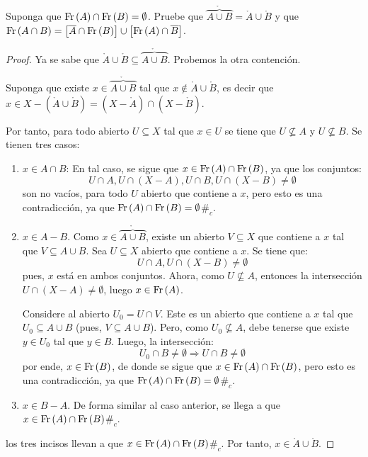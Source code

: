 \documentclass[12pt]{report}
\theoremstyle{largebreak}
\newcommand\contradiction{\ensuremath{\#_c}}
\newcommand{\Int}[1]{\ensuremath{\mathring{#1}}}
\newcommand{\Cls}[1]{\ensuremath{\overline{#1}}}
\newcommand{\Fr}[1]{\ensuremath{\textup{Fr}\left(#1\right)}}
\begin{document}
    \begin{excer}
        Suponga que $\Fr{A}\cap\Fr{B}=\emptyset$. Pruebe que $\Int{\overbrace{A\cup B}}=\Int{A}\cup\Int{B}$ y que $\Fr{A\cap B}=\left[\Cls{A}\cap\Fr{B} \right]\cup\left[\Fr{A}\cap\Cls{B} \right]$.
    \end{excer}

    \begin{proof}
        Ya se sabe que $\Int{A}\cup\Int{B}\subseteq\Int{\overbrace{A\cup B}}$. Probemos la otra contención.

        Suponga que existe $x\in\Int{\overbrace{A\cup B}}$ tal que $x\notin\Int{A}\cup\Int{B}$, es decir que $x\in X-(\Int{A}\cup\Int{B})=(X-\Int{A})\cap(X-\Int{B})$.

        Por tanto, para todo abierto $U\subseteq X$ tal que $x\in U$ se tiene que $U\nsubseteq A$ y $U\nsubseteq B$. Se tienen tres casos:
        \begin{enumerate}
            \item $x\in A\cap B$: En tal caso, se sigue que $x\in\Fr{A}\cap\Fr{B}$, ya que los conjuntos:
            \begin{equation*}
                U\cap A,U\cap (X-A),U\cap B,U\cap(X-B)\neq\emptyset
            \end{equation*}
            son no vacíos, para todo $U$ abierto que contiene a $x$, pero esto es una contradicción, ya que $\Fr{A}\cap\Fr{B}=\emptyset$\contradiction.
            \item $x\in A-B$. Como $x\in\Int{\overbrace{A\cup B}}$, existe un abierto $V\subseteq X$ que contiene a $x$ tal que $V\subseteq A\cup B$. Sea $U\subseteq X$ abierto que contiene a $x$. Se tiene que:
            \begin{equation*}
                U\cap A, U\cap (X-B)\neq\emptyset
            \end{equation*}
            pues, $x$ está en ambos conjuntos. Ahora, como $U\nsubseteq A$, entonces la intersección $U\cap (X-A)\neq\emptyset$, luego $x\in \Fr{A}$.

            Considere al abierto $U_0=U\cap V$. Este es un abierto que contiene a $x$ tal que $U_0\subseteq A\cup B$ (pues, $V\subseteq A\cup B$). Pero, como $U_0\nsubseteq A$, debe tenerse que existe $y\in U_0$ tal que $y\in B$. Luego, la intersección:
            \begin{equation*}
                U_0\cap B\neq\emptyset\Rightarrow U\cap B\neq\emptyset
            \end{equation*}
            por ende, $x\in\Fr{B}$, de donde se sigue que $x\in\Fr{A}\cap\Fr{B}$, pero esto es una contradicción, ya que $\Fr{A}\cap\Fr{B}=\emptyset$\contradiction.
            \item $x\in B-A$. De forma similar al caso anterior, se llega a que $x\in \Fr{A}\cap\Fr{B}$\contradiction.
        \end{enumerate}
        los tres incisos llevan a que $x\in\Fr{A}\cap\Fr{B}$\contradiction. Por tanto, $x\in\Int{A}\cup\Int{B}$.


\end{proof}
\end{document}
